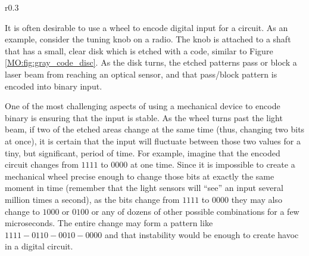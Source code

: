 \begin{wrapfigure}{r}{0.3\textwidth}
  \caption{Optical Disc}
  \label{MO:fig:gray_code_disc}
  \centering

  \xdef\IntRad{2}
  \xdef\Rad{.5}

  \newcommand{\Sector}[2][]{%
    \draw[#1] (22.5:#2) arc (22.5:0:#2)
    --(#2+\Rad,0) arc (0:22.5:#2+\Rad)
    -- cycle ;
  }

\end{wrapfigure}

It is often desirable to use a wheel to encode digital input for a circuit. As an example, consider the tuning knob on a radio. The knob is attached to a shaft that has a small, clear disk which is etched with a code, similar to Figure \ref{MO:fig:gray_code_disc}. As the disk turns, the etched patterns pass or block a laser beam from reaching an optical sensor, and that pass/block pattern is encoded into binary input. 

One of the most challenging aspects of using a mechanical device to encode binary is ensuring that the input is stable. As the wheel turns past the light beam, if two of the etched areas change at the same time (thus, changing two bits at once), it is certain that the input will fluctuate between those two values for a tiny, but significant, period of time. For example, imagine that the encoded circuit changes from $ 1111 $ to $ 0000 $ at one time. Since it is impossible to create a mechanical wheel precise enough to change those bits at exactly the same moment in time (remember that the light sensors will ``see'' an input several million times a second), as the bits change from $ 1111 $ to $ 0000 $ they may also change to $ 1000 $ or $ 0100 $ or any of dozens of other possible combinations for a few microseconds. The entire change may form a pattern like $ 1111-0110-0010-0000 $ and that instability would be enough to create havoc in a digital circuit. 

